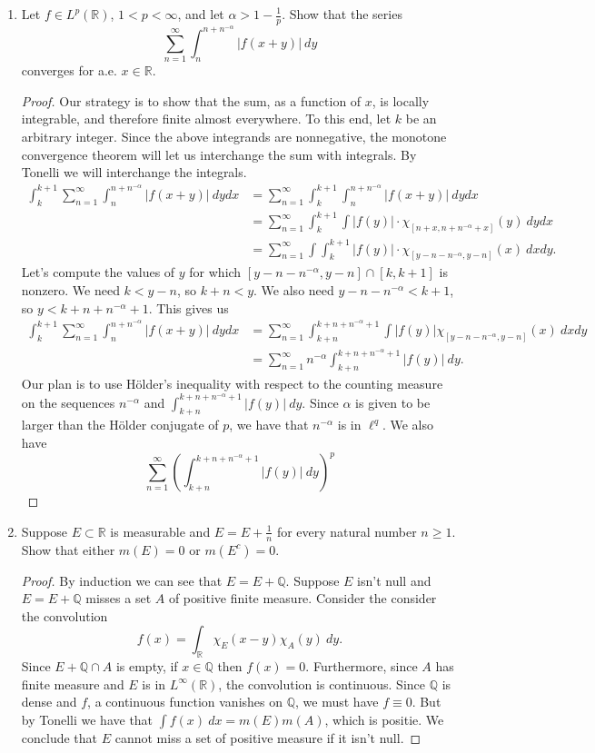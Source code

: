 \documentclass[11pt,letterpaper]{report}
\newcommand{\reals}{\mathbb{R}}
\newcommand{\rationals}{\mathbb{Q}}
\begin{document}
\begin{enumerate}
	\item Let $f\in L^p(\reals)$, $1<p<\infty$, and let $\alpha>1-\frac{1}{p}$. Show that the series
	\[
	\sum_{n=1}^\infty \int_n^{n+n^{-\alpha}}|f(x+y)|\ dy
	\]
	converges for a.e. $x\in \reals$.
	\begin{proof}
		Our strategy is to show that the sum, as a function of $x$, is locally integrable, and therefore finite almost everywhere. To this end, let $k$ be an arbitrary integer. Since the above integrands are nonnegative, the monotone convergence theorem will let us interchange the sum with integrals. By Tonelli we will interchange the integrals.
		\begin{align*}
			\int_k^{k+1}\sum_{n=1}^\infty \int_n^{n+n^{-\alpha}}|f(x+y)|\ dydx &= \sum_{n=1}^\infty \int_k^{k+1}\int_n^{n+n^{-\alpha}}|f(x+y)|\ dydx\\
			&= \sum_{n=1}^\infty \int_k^{k+1}\int|f(y)|\cdot \chi_{[n+x, n+n^{-\alpha}+x]}(y)\ dydx\\
			&= \sum_{n=1}^\infty \int\int_k^{k+1}|f(y)|\cdot \chi_{[y-n-n^{-\alpha}, y-n]}(x)\ dxdy.
		\end{align*}
		Let's compute the values of $y$ for which $[y-n-n^{-\alpha}, y-n]\cap [k, k+1]$ is nonzero. We need $k<y-n$, so $k+n<y$. We also need $y-n-n^{-\alpha}<k+1$, so $y<k+n+n^{-\alpha}+1$. This gives us
		\begin{align*}
			\int_k^{k+1}\sum_{n=1}^\infty \int_n^{n+n^{-\alpha}}|f(x+y)|\ dydx &= \sum_{n=1}^\infty \int_{k+n}^{k+n+n^{-\alpha}+1}\int|f(y)|\chi_{[y-n-n^{-\alpha}, y-n]}(x)\ dxdy\\
			&= \sum_{n=1}^\infty n^{-\alpha}\int_{k+n}^{k+n+n^{-\alpha}+1}|f(y)|\ dy.
		\end{align*}
		Our plan is to use H\"older's inequality with respect to the counting measure on the sequences $n^{-\alpha}$ and $\int_{k+n}^{k+n+n^{-\alpha}+1}|f(y)|\ dy$. Since $\alpha$ is given to be larger than the H\"older conjugate of $p$, we have that $n^{-\alpha}$ is in $\ell^q$. We also have
		\[
		\sum_{n=1}^\infty\left(\int_{k+n}^{k+n+n^{-\alpha}+1}|f(y)|\ dy\right)^p
		\]
	\end{proof}

	\item Suppose $E\subset \reals$ is measurable and $E = E+\frac{1}{n}$ for every natural number $n\geq 1$. Show that either $m(E) = 0$ or $m(E^c) = 0$.
	\begin{proof}
		By induction we can see that $E = E+\rationals$. Suppose $E$ isn't null and $E=E+\rationals$ misses a set $A$ of positive finite measure. Consider the consider the convolution
		\[
		f(x) = \int_\reals \chi_E(x-y)\chi_A(y)\ dy.
		\]
		Since $E+\rationals\cap A$ is empty, if $x\in \rationals$ then $f(x) = 0$. Furthermore, since $A$ has finite measure and $E$ is in $L^\infty(\reals)$, the convolution is continuous. Since $\rationals$ is dense and $f$, a continuous function vanishes on $\rationals$, we must have $f\equiv 0$. But by Tonelli we have that $\int f(x)\ dx = m(E)m(A)$, which is positie. We conclude that $E$ cannot miss a set of positive measure if it isn't null.
	\end{proof}
\end{enumerate}
\end{document}
